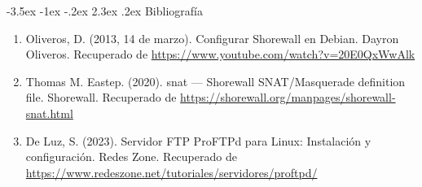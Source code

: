 \documentclass[11pt]{report}
\makeatletter
\renewcommand\chapter{\@startsection{chapter}{0}{\z@}%
    {-3.5ex \@plus -1ex \@minus -.2ex}%
    {2.3ex \@plus.2ex}%
    {\normalfont\Large\bfseries}}
\makeatother
\begin{document}
\chapter{Bibliografía} %
\begin{enumerate}
\item Oliveros, D. (2013, 14 de marzo). Configurar Shorewall en Debian. Dayron Oliveros. Recuperado de \url{https://www.youtube.com/watch?v=20E0QxWwAlk}
\item Thomas M. Eastep. (2020). snat — Shorewall SNAT/Masquerade definition file. Shorewall. Recuperado de \url{https://shorewall.org/manpages/shorewall-snat.html}
\item De Luz, S. (2023). Servidor FTP ProFTPd para Linux: Instalación y configuración. Redes Zone. Recuperado de \url{https://www.redeszone.net/tutoriales/servidores/proftpd/}
\end{enumerate}
\end{document}
